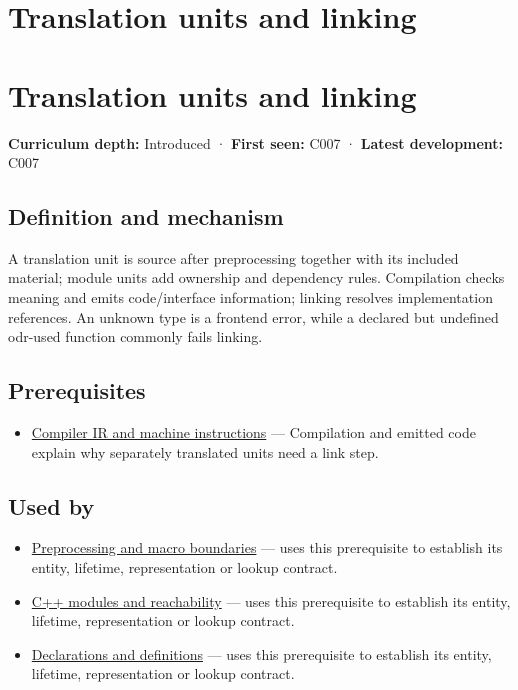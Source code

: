 \hypertarget{appendix-806686359e1b}{}
\section*{Translation units and linking}
\section{Translation units and linking}\label{appendix-806686359e1b-translation-units-and-linking}

\textbf{Curriculum depth:} Introduced · \textbf{First seen:} C007 · \textbf{Latest development:} C007

\subsection{Definition and mechanism}\label{appendix-806686359e1b-definition-and-mechanism}

A translation unit is source after preprocessing together with its included material; module units add ownership and dependency rules. Compilation checks meaning and emits code/interface information; linking resolves implementation references. An unknown type is a frontend error, while a declared but undefined odr-used function commonly fails linking.

\subsection{Prerequisites}\label{appendix-806686359e1b-prerequisites}

\begin{itemize}
\tightlist
\item
  \hyperref[appendix-942ad41afb30]{Compiler IR and machine instructions} --- Compilation and emitted code explain why separately translated units need a link step.
\end{itemize}

\subsection{Used by}\label{appendix-806686359e1b-used-by}

\begin{itemize}
\item
  \hyperref[appendix-33c0a92ce855]{Preprocessing and macro boundaries} --- uses this prerequisite to establish its entity, lifetime, representation or lookup contract.
\item
  \hyperref[appendix-410a611a5b8d]{C++ modules and reachability} --- uses this prerequisite to establish its entity, lifetime, representation or lookup contract.
\item
  \hyperref[appendix-2e4d494c2d94]{Declarations and definitions} --- uses this prerequisite to establish its entity, lifetime, representation or lookup contract.
\end{itemize}

